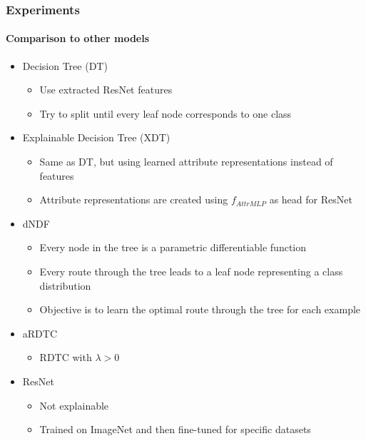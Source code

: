 \documentclass[9pt]{beamer}
\begin{document}
\begin{frame}
\frametitle{Experiments}
\framesubtitle{Comparison to other models}
\begin{itemize}
	\item Decision Tree (DT)
	\begin{itemize}
		\item Use extracted ResNet features
		\item Try to split until every leaf node corresponds to one class
	\end{itemize}
	\item Explainable Decision Tree (XDT)
	\begin{itemize}
		\item Same as DT, but using learned attribute representations instead of features
		\item Attribute representations are created using $f_{AttrMLP}$ as head for ResNet
	\end{itemize}	
	\item dNDF \cite{kontschieder2015deep}
	\begin{itemize}
		\item Every node in the tree is a parametric differentiable function
		\item Every route through the tree leads to a leaf node representing a class distribution
		\item Objective is to learn the optimal route through the tree for each example
	\end{itemize}
	\item aRDTC
	\begin{itemize}
		\item RDTC with $\lambda>0$
	\end{itemize}
		\item ResNet
	\begin{itemize}
		\item Not explainable
		\item Trained on ImageNet and then fine-tuned for specific datasets
	\end{itemize}
\end{itemize}
\end{frame}
\end{document}

